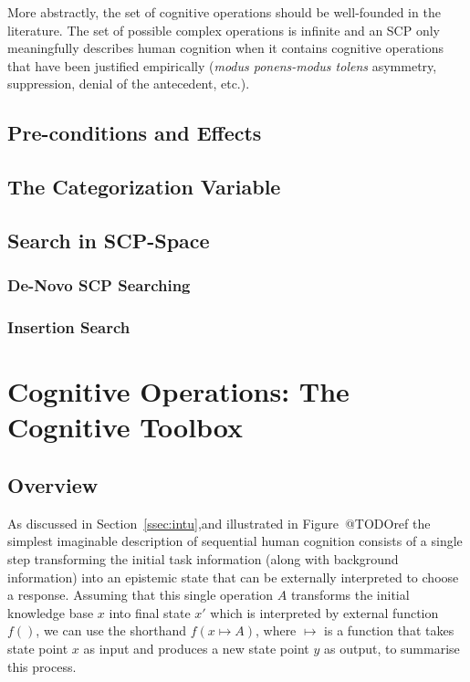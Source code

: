 \documentclass[
11pt, %
english, %
singlespacing, %
headsepline, %
]{MastersDoctoralThesis} %
\begin{document}
More abstractly, the set of cognitive operations should be well-founded in the literature. The set of possible complex operations is infinite and an SCP only meaningfully describes human cognition when it contains cognitive operations that have been justified empirically (\textit{modus ponens-modus tolens} asymmetry, suppression, denial of the antecedent, etc.). 

\section{Pre-conditions and Effects}
\section{The Categorization Variable}
\section{Search in SCP-Space}
\subsection{De-Novo SCP Searching}
\subsection{Insertion Search}

\chapter{Cognitive Operations: The Cognitive Toolbox}
\section{Overview}
As discussed in Section~\ref{ssec:intu},and illustrated in Figure~@TODOref the simplest imaginable description of sequential human cognition consists of a single step transforming the initial task information (along with background information) into an epistemic state that can be externally interpreted to choose a response. Assuming that this single operation $A$ transforms the initial knowledge base $x$ into final state $x'$ which is interpreted by external function $f()$, we can use the shorthand $f(x \longmapsto A)$, where $\longmapsto$ is a function that takes state point $x$ as input and produces a new state point $y$ as output, to summarise this process. 
\end{document}
